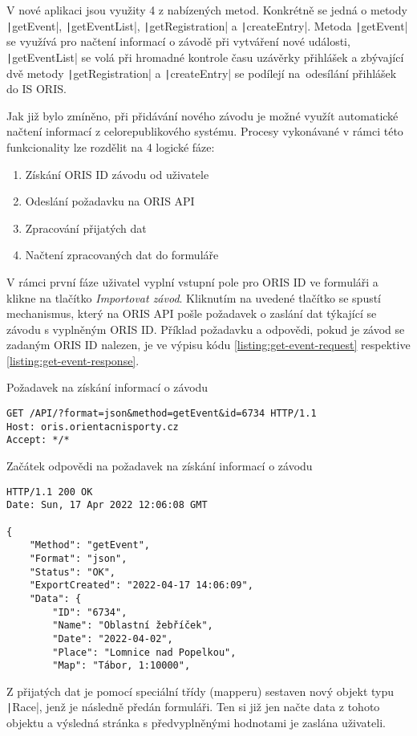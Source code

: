V nové aplikaci jsou využity 4 z nabízených metod. Konkrétně se jedná o metody \texttt|getEvent|, \texttt|getEventList|, \texttt|getRegistration| a \texttt|createEntry|. Metoda \texttt|getEvent| se využívá pro načtení informací o závodě při vytváření nové události, \texttt|getEventList| se volá při hromadné kontrole času uzávěrky přihlášek a zbývající dvě metody \texttt|getRegistration| a \texttt|createEntry| se podílejí na~odesílání přihlášek do IS ORIS.

Jak již bylo zmíněno, při přidávání nového závodu je možné využít automatické načtení informací z celorepublikového systému. Procesy vykonávané v rámci této funkcionality lze rozdělit na 4 logické fáze:
\begin{enumerate}
    \item Získání ORIS ID závodu od uživatele
    \item Odeslání požadavku na ORIS API
    \item Zpracování přijatých dat
    \item Načtení zpracovaných dat do formuláře
\end{enumerate}

V rámci první fáze uživatel vyplní vstupní pole pro ORIS ID ve formuláři a klikne na tlačítko \emph{Importovat závod}. Kliknutím na uvedené tlačítko se spustí mechanismus, který na ORIS API pošle požadavek o zaslání dat týkající se závodu s vyplněným ORIS ID. Příklad požadavku a odpovědi, pokud je závod se zadaným ORIS ID nalezen, je ve výpisu kódu \ref{listing:get-event-request} respektive \ref{listing:get-event-response}.

\begin{listing}[h]
    \caption{Požadavek na získání informací o závodu}\label{listing:get-event-request}
    \begin{verbatim}
GET /API/?format=json&method=getEvent&id=6734 HTTP/1.1
Host: oris.orientacnisporty.cz
Accept: */*
    \end{verbatim}
\end{listing}

\begin{listing}[h]
    \caption{Začátek odpovědi na požadavek na získání informací o závodu}\label{listing:get-event-response}
    \begin{verbatim}
HTTP/1.1 200 OK
Date: Sun, 17 Apr 2022 12:06:08 GMT

{
    "Method": "getEvent",
    "Format": "json",
    "Status": "OK",
    "ExportCreated": "2022-04-17 14:06:09",
    "Data": {
        "ID": "6734",
        "Name": "Oblastní žebříček",
        "Date": "2022-04-02",
        "Place": "Lomnice nad Popelkou",
        "Map": "Tábor, 1:10000",
    \end{verbatim}
\end{listing}

Z přijatých dat je pomocí speciální třídy (mapperu) sestaven nový objekt typu \texttt|Race|, jenž je následně předán formuláři. Ten si již jen načte data z tohoto objektu a výsledná stránka s předvyplněnými hodnotami je zaslána uživateli.
